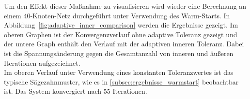 %

Um  den Effekt dieser Maßnahme zu visualisieren wird wieder eine Berechnung an einem 40-Knoten-Netz durchgeführt unter Verwendung des Warm-Starts.
In Abbildung~\ref{fig:adaptive_inner_comparison} werden die Ergebnisse gezeigt.
Im oberen Graphen ist der Konvergenzverlauf ohne adaptive Toleranz gezeigt und der untere Graph enthält den Verlauf mit der adaptiven inneren Toleranz. 
Dabei ist die Spannungsänderung gegen die Gesamtanzahl von inneren und äußeren Iterationen aufgezeichnet.\\

Im oberen Verlauf unter Verwendung eines konstanten Toleranzwertes ist das typische Sägezahnmuster, wie es in \cref{subsec:ergebnisse_warmstart} beobachtbar ist.
Das System konvergiert nach 55 Iterationen.\\




